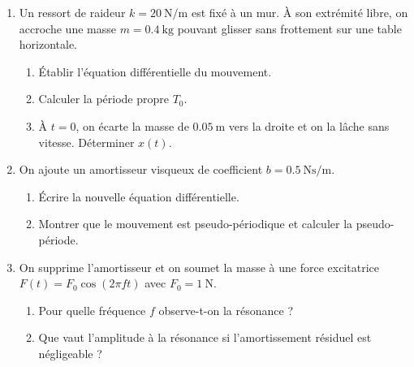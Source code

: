 \begin{enumerate}[label=\arabic*)]
    \item Un ressort de raideur $k = \SI{20}{\newton\per\metre}$ est fixé à un mur. À son extrémité libre, on accroche une masse $m = \SI{0.4}{\kilogram}$ pouvant glisser sans frottement sur une table horizontale.
    \begin{enumerate}[label=\alph*)]
        \item Établir l'équation différentielle du mouvement.
        \item Calculer la période propre $T_0$.
        \item À $t=0$, on écarte la masse de $\SI{0.05}{\metre}$ vers la droite et on la lâche sans vitesse. Déterminer $x(t)$.
    \end{enumerate}
    \item On ajoute un amortisseur visqueux de coefficient $b = \SI{0.5}{\newton\second\per\metre}$.
    \begin{enumerate}[label=\alph*)]
        \item Écrire la nouvelle équation différentielle.
        \item Montrer que le mouvement est pseudo-périodique et calculer la pseudo-période.
    \end{enumerate}
    \item On supprime l'amortisseur et on soumet la masse à une force excitatrice $F(t) = F_0\cos(2\pi f t)$ avec $F_0 = \SI{1}{\newton}$.
    \begin{enumerate}[label=\alph*)]
        \item Pour quelle fréquence $f$ observe-t-on la résonance ?
        \item Que vaut l'amplitude à la résonance si l'amortissement résiduel est négligeable ?
    \end{enumerate}
\end{enumerate}

